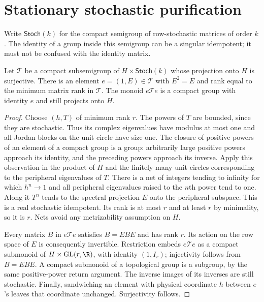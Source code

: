\section{Stationary stochastic purification}\label{sec:purification55}
Write $\mathsf{Stoch}(k)$ for the compact semigroup of row-stochastic matrices of order $k$. The identity of a group inside this semigroup can be a singular idempotent; it must not be confused with the identity matrix.

\begin{lemma}\label{lem:idempotent55}
Let $\mathcal T$ be a compact subsemigroup of $H\times\mathsf{Stoch}(k)$ whose projection onto $H$ is surjective. There is an element $e=(1,E)\in\mathcal T$ with $E^2=E$ and rank equal to the minimum matrix rank in $\mathcal T$. The monoid $e\mathcal T e$ is a compact group with identity $e$ and still projects onto $H$.
\end{lemma}
\begin{proof}
Choose $(h,T)$ of minimum rank $r$. The powers of $T$ are bounded, since they are stochastic. Thus its complex eigenvalues have modulus at most one and all Jordan blocks on the unit circle have size one. The closure of positive powers of an element of a compact group is a group: arbitrarily large positive powers approach its identity, and the preceding powers approach its inverse. Apply this observation in the product of $H$ and the finitely many unit circles corresponding to the peripheral eigenvalues of $T$. There is a net of integers tending to infinity for which $h^n\to1$ and all peripheral eigenvalues raised to the $n$th power tend to one. Along it $T^n$ tends to the spectral projection $E$ onto the peripheral subspace. This is a real stochastic idempotent. Its rank is at most $r$ and at least $r$ by minimality, so it is $r$. Nets avoid any metrizability assumption on $H$.

Every matrix $B$ in $e\mathcal T e$ satisfies $B=EBE$ and has rank $r$. Its action on the row space of $E$ is consequently invertible. Restriction embeds $e\mathcal T e$ as a compact submonoid of $H\times\mathrm{GL}(r,\R)$, with identity $(1,I_r)$; injectivity follows from $B=EBE$. A compact submonoid of a topological group is a subgroup, by the same positive-power return argument. The inverse images of its inverses are still stochastic. Finally, sandwiching an element with physical coordinate $h$ between $e$'s leaves that coordinate unchanged. Surjectivity follows.
\end{proof}

